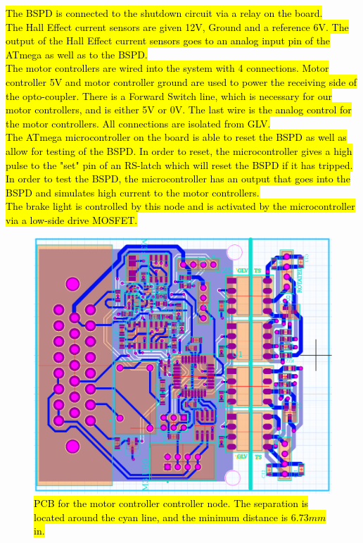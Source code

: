 \documentclass{article}
\DeclareRobustCommand{\hlr}[1]{{\sethlcolor{red}\hl{#1}}}
\begin{document}
        \hlr{The BSPD is connected to the shutdown circuit via a relay on the board.}\\

        \hlr{The Hall Effect current sensors are given 12V, Ground and a reference 6V. The output of the Hall Effect current sensors goes to an analog input pin of the ATmega as well as to the BSPD.}\\

        \hlr{The motor controllers are wired into the system with 4 connections. Motor controller 5V and motor controller ground are used to power the receiving side of the opto-coupler. There is a Forward Switch line, which is necessary for our motor controllers, and is either 5V or 0V. The last wire is the analog control for the motor controllers. All connections are isolated from GLV.}\\

        \hlr{The ATmega microcontroller on the board is able to reset the BSPD as well as allow for testing of the BSPD. In order to reset, the microcontroller gives a high pulse to the "set" pin of an RS-latch which will reset the BSPD if it has tripped. In order to test the BSPD, the microcontroller has an output that goes into the BSPD and simulates high current to the motor controllers.}\\

        \hlr{The brake light is controlled by this node and is activated by the microcontroller via a low-side drive MOSFET.}\\

        \begin{figure}[H]
        \centering
        \includegraphics[width = 0.8 \textwidth]{mccPCB}
        \caption{\hlr{PCB for the motor controller controller node. The separation is located around the cyan line, and the minimum distance is $6.73 mm$ in.}}
        \label{mccPCB}
        \end{figure}
\end{document}
